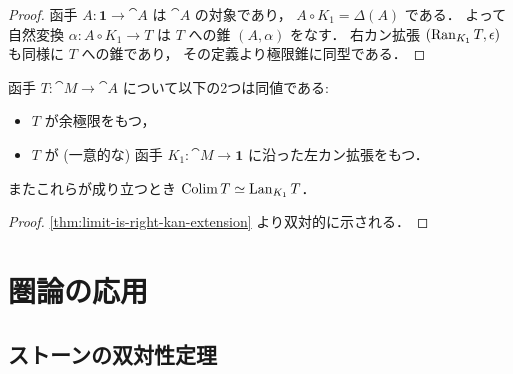 \documentclass[titlepage]{ltjsreport}
\newtheorem[S]{theorem}{定理}[chapter]
\newtheorem[S]{definition}[theorem]{定義}
\newtheorem[S]{example}[theorem]{例}
\begin{document}
\begin{proof}
  函手 $A:\mathbf{1}\to\cat{A}$ は $\cat{A}$ の対象であり，
  $A\circ K_1=\Delta(A)$ である．
  よって自然変換 $\alpha:A\circ K_1\to T$ は $T$ への錐 $(A,\alpha)$ をなす．
  右カン拡張 $(\operatorname{Ran}_{K_1}T,\epsilon)$ も同様に $T$ への錐であり，
  その定義より極限錐に同型である．
\end{proof}

\begin{center}
  \begin{minipage}[b]{0.4\linewidth}
    
  \end{minipage}
  \begin{minipage}[b]{0.4\linewidth}
    
  \end{minipage}
\end{center}

\begin{theorem}[余極限は左カン拡張である]
  函手 $T:\cat{M}\to\cat{A}$ について以下の2つは同値である:
  \begin{itemize}
    \item $T$ が余極限をもつ，
    \item $T$ が (一意的な) 函手 $K_1:\cat{M}\to\mathbf{1}$
          に沿った左カン拡張をもつ．
  \end{itemize}
  またこれらが成り立つとき $\operatorname{Colim} T\simeq\operatorname{Lan}_{K_1}T$．
\end{theorem}

\begin{proof}
  \cref{thm:limit-is-right-kan-extension} より双対的に示される．
\end{proof}

\begin{center}
  \begin{minipage}[b]{0.4\linewidth}
    
  \end{minipage}
  \begin{minipage}[b]{0.4\linewidth}
    
  \end{minipage}
\end{center}

\chapter{圏論の応用}

\section{ストーンの双対性定理}
\end{document}
